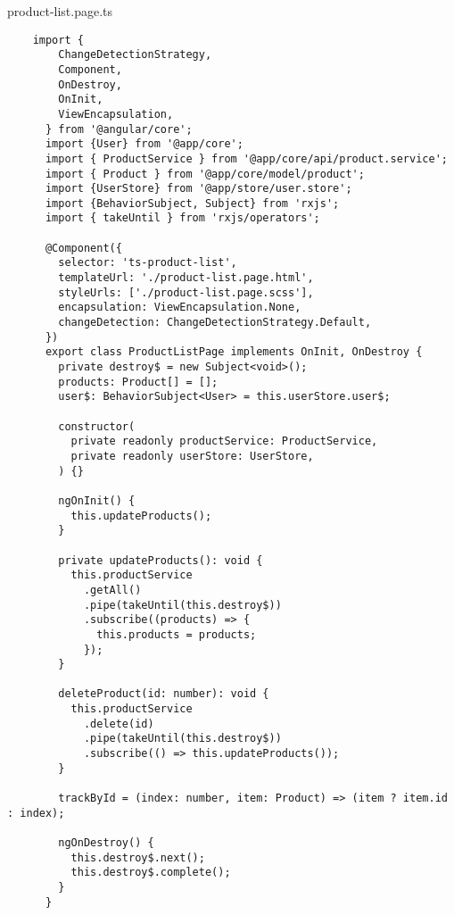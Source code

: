 product-list.page.ts
\lstset{style=ts}
\begin{lstlisting}
    import {
        ChangeDetectionStrategy,
        Component,
        OnDestroy,
        OnInit,
        ViewEncapsulation,
      } from '@angular/core';
      import {User} from '@app/core';
      import { ProductService } from '@app/core/api/product.service';
      import { Product } from '@app/core/model/product';
      import {UserStore} from '@app/store/user.store';
      import {BehaviorSubject, Subject} from 'rxjs';
      import { takeUntil } from 'rxjs/operators';
      
      @Component({
        selector: 'ts-product-list',
        templateUrl: './product-list.page.html',
        styleUrls: ['./product-list.page.scss'],
        encapsulation: ViewEncapsulation.None,
        changeDetection: ChangeDetectionStrategy.Default,
      })
      export class ProductListPage implements OnInit, OnDestroy {
        private destroy$ = new Subject<void>();
        products: Product[] = [];
        user$: BehaviorSubject<User> = this.userStore.user$;
      
        constructor(
          private readonly productService: ProductService,
          private readonly userStore: UserStore,
        ) {}
      
        ngOnInit() {
          this.updateProducts();
        }
      
        private updateProducts(): void {
          this.productService
            .getAll()
            .pipe(takeUntil(this.destroy$))
            .subscribe((products) => {
              this.products = products;
            });
        }
      
        deleteProduct(id: number): void {
          this.productService
            .delete(id)
            .pipe(takeUntil(this.destroy$))
            .subscribe(() => this.updateProducts());
        }
      
        trackById = (index: number, item: Product) => (item ? item.id : index);
      
        ngOnDestroy() {
          this.destroy$.next();
          this.destroy$.complete();
        }
      }      
\end{lstlisting}

